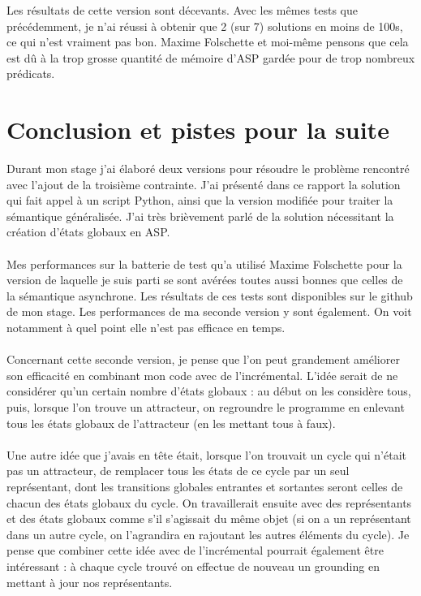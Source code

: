 \documentclass[10pt,a4paper]{article}
\begin{document}
Les résultats de cette version sont décevants. Avec les mêmes tests que précédemment, je n'ai réussi à obtenir que 2 (sur 7) solutions en moins de 100s, ce qui n'est vraiment pas bon. Maxime Folschette et moi-même pensons que cela 
est dû à la trop grosse quantité de mémoire d'ASP gardée pour de trop nombreux prédicats.

\newpage
\section{Conclusion et pistes pour la suite}
Durant mon stage j'ai élaboré deux versions pour résoudre le problème rencontré avec l'ajout de la troisième contrainte. J'ai présenté dans ce rapport la solution qui fait appel à un script Python, ainsi que la version modifiée 
pour traiter la sémantique généralisée. J'ai très brièvement parlé de la solution nécessitant la création d'états globaux en ASP.\\ \\
Mes performances sur la batterie de test qu'a utilisé Maxime Folschette pour la version de laquelle je suis parti se sont avérées toutes aussi bonnes que celles de la sémantique asynchrone. Les résultats de ces tests sont 
disponibles sur le github de mon stage. Les performances de ma seconde version y sont également. On voit notamment à quel point 
elle n'est pas efficace en temps.\\ \\
Concernant cette seconde version, je pense que l'on peut grandement améliorer son efficacité en combinant mon code avec de l'incrémental. L'idée serait de ne considérer qu'un certain nombre d'états globaux : au début on les 
considère tous, puis, lorsque l'on trouve un attracteur, on regroundre le programme en enlevant tous les états globaux de l'attracteur (en les mettant tous à faux).\\ \\
Une autre idée que j'avais en tête était, lorsque l'on trouvait un cycle qui n'était pas un attracteur, de remplacer tous les états de ce cycle par un seul représentant, dont les transitions globales entrantes et sortantes 
seront celles de chacun des états globaux du cycle. On travaillerait ensuite avec des représentants et des états globaux comme s'il s'agissait du même objet (si on a un représentant dans un autre cycle, on l'agrandira en rajoutant 
les autres éléments du cycle). Je pense que combiner cette idée avec de l'incrémental pourrait également être intéressant : à chaque cycle trouvé on effectue de nouveau un grounding en mettant à jour nos représentants.\\ \\
\end{document}
